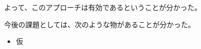 よって、このアプローチは有効であるということが分かった。


今後の課題としては、次のような物があることが分かった。
\begin{itemize}
	\item 仮%
\end{itemize}


